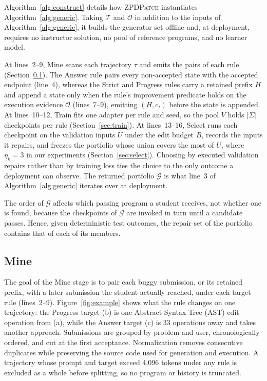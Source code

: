 \documentclass[10pt,conference]{IEEEtran}
\begin{document}
Algorithm~\ref{alg:construct} details how \textsc{ZPDPatch} instantiates Algorithm~\ref{alg:generic}. Taking \(\mathcal T\) and \(\mathcal O\) in addition to the inputs of Algorithm~\ref{alg:generic}, it builds the generator set offline and, at deployment, requires no instructor solution, no pool of reference programs, and no learner model.

At lines~2--9, Mine scans each trajectory \(\tau\) and emits the pairs of each rule (Section~\ref{sec:mine}). The Answer rule pairs every non-accepted state with the accepted endpoint (line~4), whereas the Strict and Progress rules carry a retained prefix \(H\) and append a state only when the rule's improvement predicate holds on the execution evidence \(\mathcal O\) (lines~7--9), emitting \((H,c_t)\) before the state is appended. At lines~10--12, Train fits one adapter per rule and seed, so the pool \(V\) holds \(|\Sigma|\) checkpoints per rule (Section~\ref{sec:train}). At lines~13--16, Select runs each checkpoint on the validation inputs \(U\) under the edit budget \(B\), records the inputs it repairs, and freezes the portfolio whose union covers the most of \(U\), where \(\eta_k=3\) in our experiments (Section~\ref{sec:select}). Choosing by executed validation repairs rather than by training loss ties the choice to the only outcome a deployment can observe. The returned portfolio \(\mathcal G\) is what line~3 of Algorithm~\ref{alg:generic} iterates over at deployment.

The order of \(\mathcal G\) affects which passing program a student receives, not whether one is found, because the checkpoints of \(\mathcal G\) are invoked in turn until a candidate passes. Hence, given deterministic test outcomes, the repair set of the portfolio contains that of each of its members.


\subsection{Mine}
\label{sec:mine}

The goal of the Mine stage is to pair each buggy submission, or its retained prefix, with a later submission the student actually reached, under each target rule (lines~2--9). Figure~\ref{fig:example} shows what the rule changes on one trajectory: the Progress target (b) is one Abstract Syntax Tree (AST) edit operation from (a), while the Answer target (c) is 33 operations away and takes another approach. Submissions are grouped by problem and user, chronologically ordered, and cut at the first acceptance. Normalization removes consecutive duplicates while preserving the source code used for generation and execution. A trajectory whose prompt and target exceed 4,096 tokens under any rule is excluded as a whole before splitting, so no program or history is truncated.
\end{document}
